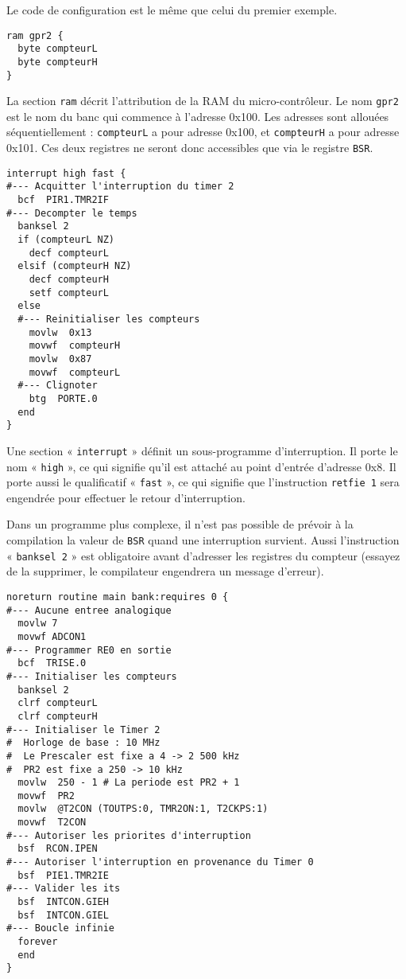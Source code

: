 Le code de configuration est le même que celui du premier exemple.


\begin{lstlisting}[language=piccolo]
ram gpr2 {
  byte compteurL
  byte compteurH
}
\end{lstlisting}
La section \texttt{ram} décrit l’attribution de la RAM du micro-contrôleur. Le nom \texttt{gpr2} est le nom du banc qui commence à l’adresse 0x100. Les adresses sont allouées séquentiellement : \texttt{compteurL} a pour adresse 0x100, et \texttt{compteurH} a pour adresse 0x101. Ces deux registres ne seront donc accessibles que via le registre \texttt{BSR}.


\begin{lstlisting}[language=piccolo]
interrupt high fast {
#--- Acquitter l'interruption du timer 2 
  bcf  PIR1.TMR2IF 
#--- Decompter le temps
  banksel 2 
  if (compteurL NZ)
    decf compteurL
  elsif (compteurH NZ)
    decf compteurH
    setf compteurL
  else
  #--- Reinitialiser les compteurs
    movlw  0x13
    movwf  compteurH
    movlw  0x87
    movwf  compteurL
  #--- Clignoter
    btg  PORTE.0
  end
}
\end{lstlisting}
Une section « \texttt{interrupt} » définit un sous-programme d’interruption. Il porte le nom « \texttt{high} », ce qui signifie qu’il est attaché au point d’entrée d’adresse 0x8. Il porte aussi le qualificatif « \texttt{fast} », ce qui signifie que l’instruction \texttt{retfie 1} sera engendrée pour effectuer le retour d’interruption.

Dans un programme plus complexe, il n’est pas possible de prévoir à la compilation la valeur de \texttt{BSR} quand une interruption survient. Aussi l’instruction « \texttt{banksel 2} » est obligatoire avant d’adresser les registres du compteur (essayez de la supprimer, le compilateur engendrera un message d'erreur).

\begin{lstlisting}[language=piccolo]
noreturn routine main bank:requires 0 {
#--- Aucune entree analogique
  movlw 7
  movwf ADCON1
#--- Programmer RE0 en sortie
  bcf  TRISE.0
#--- Initialiser les compteurs
  banksel 2
  clrf compteurL
  clrf compteurH
#--- Initialiser le Timer 2
#  Horloge de base : 10 MHz
#  Le Prescaler est fixe a 4 -> 2 500 kHz
#  PR2 est fixe a 250 -> 10 kHz
  movlw  250 - 1 # La periode est PR2 + 1
  movwf  PR2
  movlw  @T2CON (TOUTPS:0, TMR2ON:1, T2CKPS:1)
  movwf  T2CON  
#--- Autoriser les priorites d'interruption
  bsf  RCON.IPEN
#--- Autoriser l'interruption en provenance du Timer 0
  bsf  PIE1.TMR2IE
#--- Valider les its
  bsf  INTCON.GIEH
  bsf  INTCON.GIEL
#--- Boucle infinie
  forever
  end
}
\end{lstlisting}


